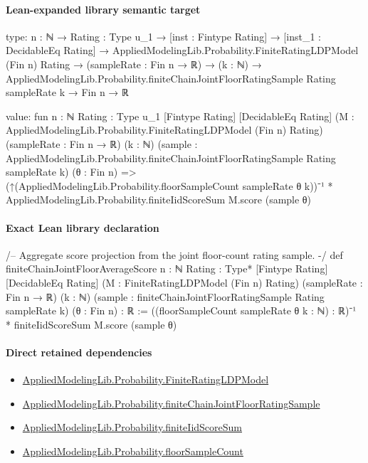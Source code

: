 \documentclass[10pt]{article}
\begin{document}
\paragraph{Lean-expanded library semantic target}
\begin{ReviewVerbatim}
type:
{n : ℕ} →
  {Rating : Type u_1} →
    [inst : Fintype Rating] →
      [inst_1 : DecidableEq Rating] →
        AppliedModelingLib.Probability.FiniteRatingLDPModel (Fin n) Rating →
          (sampleRate : Fin n → ℝ) →
            (k : ℕ) → AppliedModelingLib.Probability.finiteChainJointFloorRatingSample Rating sampleRate k → Fin n → ℝ

value:
fun {n : ℕ} {Rating : Type u_1} [Fintype Rating] [DecidableEq Rating]
    (M : AppliedModelingLib.Probability.FiniteRatingLDPModel (Fin n) Rating) (sampleRate : Fin n → ℝ) (k : ℕ)
    (sample : AppliedModelingLib.Probability.finiteChainJointFloorRatingSample Rating sampleRate k) (θ : Fin n) =>
  (↑(AppliedModelingLib.Probability.floorSampleCount sampleRate θ k))⁻¹ *
    AppliedModelingLib.Probability.finiteIidScoreSum M.score (sample θ)
\end{ReviewVerbatim}

\paragraph{Exact Lean library declaration}
\begin{ReviewVerbatim}
/-- Aggregate score projection from the joint floor-count rating sample. -/
def finiteChainJointFloorAverageScore
    {n : ℕ} {Rating : Type*} [Fintype Rating] [DecidableEq Rating]
    (M : FiniteRatingLDPModel (Fin n) Rating) (sampleRate : Fin n → ℝ)
    (k : ℕ) (sample : finiteChainJointFloorRatingSample Rating sampleRate k)
    (θ : Fin n) : ℝ :=
  ((floorSampleCount sampleRate θ k : ℕ) : ℝ)⁻¹ *
    finiteIidScoreSum M.score (sample θ)
\end{ReviewVerbatim}

\paragraph{Direct retained dependencies}
\begin{itemize}\raggedright
\item \hyperlink{governing-declaration-765e92a42a7a9947}{Applied\allowbreak{}Modeling\allowbreak{}Lib.\allowbreak{}Probability.\allowbreak{}Finite\allowbreak{}Rating\allowbreak{}LDP\allowbreak{}Model}
\item \hyperlink{governing-declaration-1621389df1a48b09}{Applied\allowbreak{}Modeling\allowbreak{}Lib.\allowbreak{}Probability.\allowbreak{}finite\allowbreak{}Chain\allowbreak{}Joint\allowbreak{}Floor\allowbreak{}Rating\allowbreak{}Sample}
\item \hyperlink{governing-declaration-65283b6bc1ebd8c0}{Applied\allowbreak{}Modeling\allowbreak{}Lib.\allowbreak{}Probability.\allowbreak{}finite\allowbreak{}Iid\allowbreak{}Score\allowbreak{}Sum}
\item \hyperlink{library-prerequisite-b01059f5e405e09c}{Applied\allowbreak{}Modeling\allowbreak{}Lib.\allowbreak{}Probability.\allowbreak{}floor\allowbreak{}Sample\allowbreak{}Count}
\end{itemize}
\end{document}
